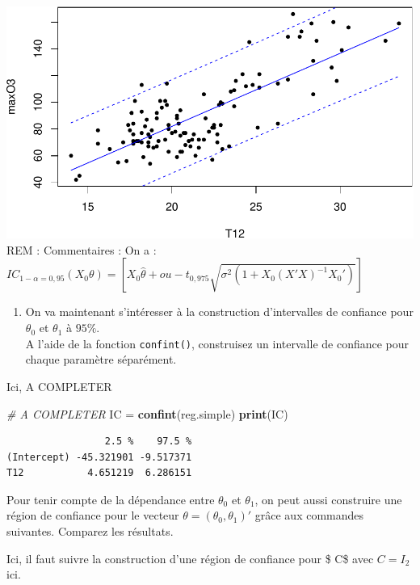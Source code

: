 \documentclass[
]{article}
\newenvironment{Shaded}{\begin{snugshade}}{\end{snugshade}}
\newcommand{\CommentTok}[1]{\textcolor[rgb]{0.56,0.35,0.01}{\textit{#1}}}
\newcommand{\FunctionTok}[1]{\textcolor[rgb]{0.13,0.29,0.53}{\textbf{#1}}}
\newcommand{\NormalTok}[1]{#1}
\newcommand{\OtherTok}[1]{\textcolor[rgb]{0.56,0.35,0.01}{#1}}
\providecommand{\tightlist}{%
  \setlength{\itemsep}{0pt}\setlength{\parskip}{0pt}}
\begin{document}
\includegraphics{TP-ML-Regression_files/figure-latex/unnamed-chunk-15-1.pdf}
REM : Commentaires : On a :
\(IC_{1 - \alpha = 0,95}(X_0\theta) = [X_0\hat{\theta} + ou - t_{0,975}\sqrt{\sigma^{2}(1 + X_0(X'X)^{-1}X_0')}]\)

\begin{enumerate}
\def\labelenumi{\arabic{enumi}.}
\setcounter{enumi}{5}
\tightlist
\item
  On va maintenant s'intéresser à la construction d'intervalles de
  confiance pour \(\theta_0\) et \(\theta_1\) à \(95\%\).\\
  A l'aide de la fonction \texttt{confint()}, construisez un intervalle
  de confiance pour chaque paramètre séparément.
\end{enumerate}

Ici, A COMPLETER

\begin{Shaded}
\begin{Highlighting}[]
\CommentTok{\# A COMPLETER}
\NormalTok{IC }\OtherTok{=} \FunctionTok{confint}\NormalTok{(reg.simple)}
\FunctionTok{print}\NormalTok{(IC)}
\end{Highlighting}
\end{Shaded}

\begin{verbatim}
                 2.5 %    97.5 %
(Intercept) -45.321901 -9.517371
T12           4.651219  6.286151
\end{verbatim}

Pour tenir compte de la dépendance entre \(\theta_0\) et \(\theta_1\),
on peut aussi construire une région de confiance pour le vecteur
\(\theta=(\theta_0,\theta_1)'\) grâce aux commandes suivantes. Comparez
les résultats.

Ici, il faut suivre la construction d'une région de confiance pour \$
C\theta\$ avec \(C=I_2\) ici.
\end{document}
